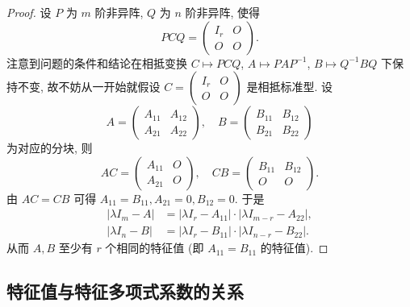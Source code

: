 \documentclass[../../main.tex]{subfiles}%
\begin{document}
\begin{proof}

设 $P$ 为 $m$ 阶非异阵, $Q$ 为 $n$ 阶非异阵, 使得
\[
PCQ = 
\begin{pmatrix}
I_r & O \\
O & O
\end{pmatrix}.
\]
注意到问题的条件和结论在相抵变换 $C \mapsto PCQ$, $A \mapsto PAP^{-1}$, $B \mapsto Q^{-1} BQ$ 下保持不变, 故不妨从一开始就假设 $C = 
\begin{pmatrix}
I_r & O \\
O & O
\end{pmatrix}$
是相抵标准型. 设
\[
A = 
\begin{pmatrix}
A_{11} & A_{12} \\
A_{21} & A_{22}
\end{pmatrix}, \quad
B = 
\begin{pmatrix}
B_{11} & B_{12} \\
B_{21} & B_{22}
\end{pmatrix}
\]
为对应的分块, 则
\[
AC = 
\begin{pmatrix}
A_{11} & O \\
A_{21} & O
\end{pmatrix}, \quad
CB = 
\begin{pmatrix}
B_{11} & B_{12} \\
O & O
\end{pmatrix}.
\]
由 $AC = CB$ 可得 $A_{11} = B_{11}, A_{21} = 0, B_{12} = 0$. 于是
\begin{align*}
| \lambda I_m - A | &= | \lambda I_r - A_{11} | \cdot | \lambda I_{m-r} - A_{22} |, \\
| \lambda I_n - B | &= | \lambda I_r - B_{11} | \cdot | \lambda I_{n-r} - B_{22} |.
\end{align*}
从而 $A, B$ 至少有 $r$ 个相同的特征值 (即 $A_{11} = B_{11}$ 的特征值).

\end{proof}

\subsection{特征值与特征多项式系数的关系}
\end{document}
